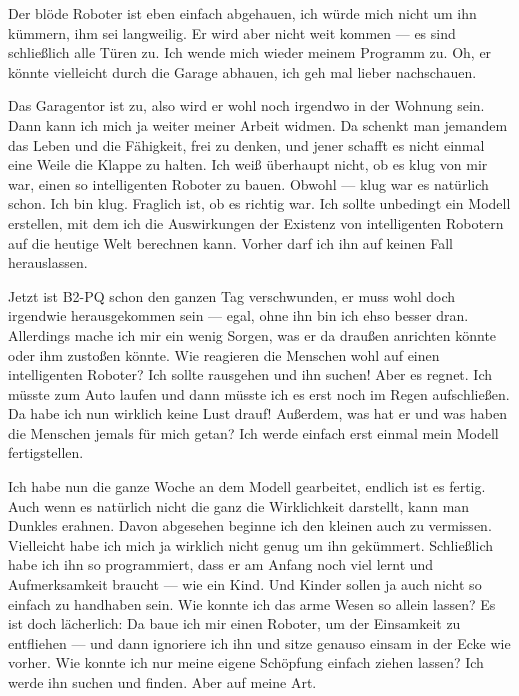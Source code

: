 Der blöde Roboter ist eben einfach abgehauen, ich würde mich nicht um ihn kümmern, ihm sei langweilig. Er wird aber nicht weit kommen — es sind schließlich alle Türen zu. Ich wende mich wieder meinem Programm zu. Oh, er könnte vielleicht durch die Garage abhauen, ich geh mal lieber nachschauen.
 
Das Garagentor ist zu, also wird er wohl noch irgendwo in der Wohnung sein. Dann kann ich mich ja weiter meiner Arbeit widmen. Da schenkt man jemandem das Leben und die Fähigkeit, frei zu denken, und jener schafft es nicht einmal eine Weile die Klappe zu halten. Ich weiß überhaupt nicht, ob es klug von mir war, einen so intelligenten Roboter zu bauen. Obwohl — klug war es natürlich schon. Ich bin klug. Fraglich ist, ob es richtig war. Ich sollte unbedingt ein Modell erstellen, mit dem ich die Auswirkungen der Existenz von intelligenten Robotern auf die heutige Welt berechnen kann. Vorher darf ich ihn auf keinen Fall herauslassen.

Jetzt ist B2-PQ schon den ganzen Tag verschwunden, er muss wohl doch irgendwie herausgekommen sein — egal, ohne ihn bin ich ehso besser dran. Allerdings mache ich mir ein wenig Sorgen, was er da draußen anrichten könnte oder ihm zustoßen könnte. Wie reagieren die Menschen wohl auf einen intelligenten Roboter? Ich sollte rausgehen und ihn suchen! Aber es regnet. Ich müsste zum Auto laufen und dann müsste ich es erst noch im Regen aufschließen. Da habe ich nun wirklich keine Lust drauf! Außerdem, was hat er und was haben die Menschen jemals für mich getan? Ich werde einfach erst einmal mein Modell fertigstellen.

Ich habe nun die ganze Woche an dem Modell gearbeitet, endlich ist es fertig. Auch wenn es natürlich nicht die ganz die Wirklichkeit darstellt, kann man Dunkles erahnen. Davon abgesehen beginne ich den kleinen auch zu vermissen. Vielleicht habe ich mich ja wirklich nicht genug um ihn gekümmert. Schließlich habe ich ihn so programmiert, dass er am Anfang noch viel lernt und Aufmerksamkeit braucht — wie ein Kind. Und Kinder sollen ja auch nicht so einfach zu handhaben sein. Wie konnte ich das arme Wesen so allein lassen? Es ist doch lächerlich: Da baue ich mir einen Roboter, um der Einsamkeit zu entfliehen — und dann ignoriere ich ihn und sitze genauso einsam in der Ecke wie vorher. Wie konnte ich nur meine eigene Schöpfung einfach ziehen lassen? Ich werde ihn suchen und finden. Aber auf meine Art.

